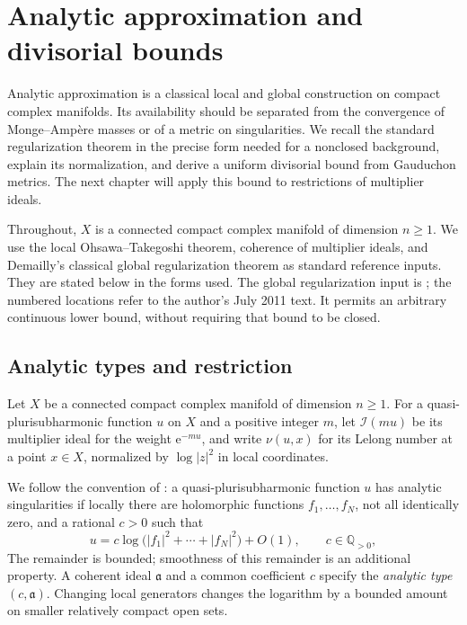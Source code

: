 \chapter{Analytic approximation and divisorial bounds}
\label{chap:analytic-approximation}

Analytic approximation is a classical local and global construction on compact complex manifolds. Its availability should be separated from the convergence of Monge--Amp\`ere masses or of a metric on singularities. We recall the standard regularization theorem in the precise form needed for a nonclosed background, explain its normalization, and derive a uniform divisorial bound from Gauduchon metrics. The next chapter will apply this bound to restrictions of multiplier ideals.

Throughout, $X$ is a connected compact complex manifold of dimension $n\geq1$. We use the local Ohsawa--Takegoshi theorem, coherence of multiplier ideals, and Demailly's classical global regularization theorem as standard reference inputs. They are stated below in the forms used. The global regularization input is \cite[Theorem 14.12 and its construction]{DemAM11}; the numbered locations refer to the author's July 2011 text. It permits an arbitrary continuous lower bound, without requiring that bound to be closed.

\section{Analytic types and restriction}\label{sec:analytic-types}

Let $X$ be a connected compact complex manifold of dimension $n\geq1$. For a quasi-plurisubharmonic function $u$ on $X$ and a positive integer $m$, let $\mathcal I(mu)$ be its multiplier ideal for the weight $\mathrm{e}^{-mu}$, and write $\nu(u,x)$ for its Lelong number at a point $x\in X$, normalized by $\log|z|^2$ in local coordinates.

We follow the convention of \cite{SGPT}: a quasi-plurisubharmonic function $u$ has analytic singularities if locally there are holomorphic functions $f_1,\ldots,f_N$, not all identically zero, and a rational $c>0$ such that
\[
 u=c\log\bigl(|f_1|^2+\cdots+|f_N|^2\bigr)+O(1),
 \qquad c\in\mathbb Q_{>0},
\]
The remainder is bounded; smoothness of this remainder is an additional property. A coherent ideal $\mathfrak a$ and a common coefficient $c$ specify the \emph{analytic type} $(c,\mathfrak a)$. Changing local generators changes the logarithm by a bounded amount on smaller relatively compact open sets.

